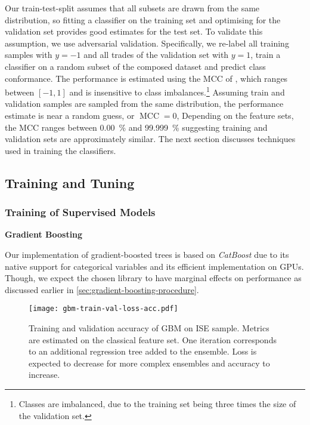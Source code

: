 Our train-test-split assumes that all subsets are drawn from the same distribution, so fitting a classifier on the training set and optimising for the validation set provides good estimates for the test set. To validate this assumption, we use adversarial validation. Specifically, we re-label all training samples with $y=-1$ and all trades of the validation set with $y=1$, train a classifier on a random subset of the composed dataset and predict class conformance. The performance is estimated using the \gls{MCC} of \textcite[][445]{matthewsComparisonPredictedObserved1975}, which ranges between $\left[-1, 1\right]$ and is insensitive to class imbalances.\footnote{Classes are imbalanced, due to the training set being three times the size of the validation set.} Assuming train and validation samples are sampled from the same distribution, the performance estimate is near a random guess, or $\operatorname{MCC} = 0$, Depending on the feature sets, the \gls{MCC} ranges between \SI{0.00}{\percent} and \SI{99.999}{\percent} suggesting training and validation sets are approximately similar. The next section discusses techniques used in training the classifiers.

\subsection{Training and Tuning}\label{sec:training-and-tuning}

\subsubsection{Training of Supervised
    Models}\label{sec:training-of-supervised-models}

\textbf{Gradient Boosting}

Our implementation of gradient-boosted trees is based on \emph{CatBoost} \autocite[][5--6]{prokhorenkovaCatBoostUnbiasedBoosting2018} due to its native support for categorical variables and its efficient implementation on \glspl{GPU}. Though, we expect the chosen library to have marginal effects on performance as discussed earlier in \cref{sec:gradient-boosting-procedure}.

\begin{figure}[ht]
    \centering
    \texttt{[image: gbm-train-val-loss-acc.pdf]}
    \caption[Training and Validation Accuracy of  on  Sample]{Training and validation accuracy of \gls{GBM} on \gls{ISE} sample. Metrics are estimated on the classical feature set. One iteration corresponds to an additional regression tree added to the ensemble. Loss is expected to decrease for more complex ensembles and accuracy to increase.}
    \label{fig:gbm-train-val-loss-acc}
\end{figure}


